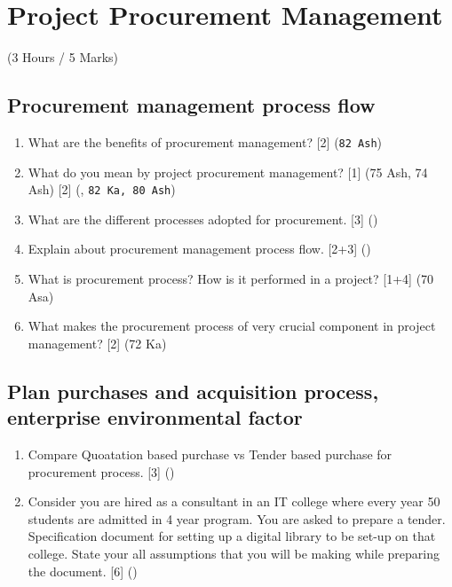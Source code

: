\documentclass[12pt]{article}
\begin{document}
\section{Project Procurement Management}
  \begin{center}(3 Hours / 5 Marks)\end{center}

  \subsection{Procurement management process flow}
    \begin{enumerate}
      \item What are the benefits of procurement management? \hfill [2] (\texttt{82 Ash})

      \item What do you mean by project procurement management? \hfill [1] (75 Ash, 74 Ash) [2] (, \texttt{82 Ka, 80 Ash})

      \item What are the different processes adopted for procurement. \hfill [3] ()

      \item Explain about procurement management process flow. \hfill [2+3] ()

      \item What is procurement process? How is it performed in a project? \hfill [1+4] (70 Asa)

      \item What makes the procurement process of very crucial component in project management? \hfill [2] (72 Ka)
    \end{enumerate}

  \subsection{Plan purchases and acquisition process, enterprise environmental factor}
    \begin{enumerate}
      \item Compare Quoatation based purchase vs Tender based purchase for procurement process. \hfill [3] ()

      \item Consider you are hired as a consultant in an IT college where every year 50 students are admitted in 4 year program. You are asked to prepare a tender. Specification document for setting up a digital library to be set-up on that college. State your all assumptions that you will be making while preparing the document. \hfill [6] ()
    \end{enumerate}
\end{document}

